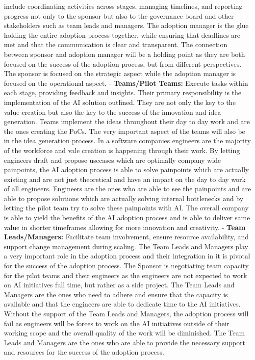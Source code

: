 \documentclass[]{imc-inf}
\begin{document}
include coordinating activities across stages, managing timelines, and
reporting progress not only to the sponsor but also to the governance
board and other stakeholders such as team leads and managers. The
adoption manager is the glue holding the entire adoption process
together, while ensuring that deadlines are met and that the
communication is clear and transparent. The connection between sponsor
and adoption manager will be a holding point as they are both focused on
the success of the adoption process, but from different perspectives.
The sponsor is focused on the strategic aspect while the adoption
manager is focused on the operational aspect. - \textbf{Teams/Pilot
	Teams:} Execute tasks within each stage, providing feedback and
insights. Their primary responsibility is the implementation of the AI
solution outlined. They are not only the key to the value creation but
also the key to the success of the innovation and idea generation. Teams
implement the ideas throughout their day to day work and are the ones
creating the PoCs. The very important aspect of the teams will also be
in the idea generation process. In a software companies engineers are
the majority of the workforce and vale creation is happening through
their work. By letting engineers draft and propose usecases which are
optimally company wide painpoints, the AI adoption process is able to
solve painpoints which are actually existing and are not just
theoretical and have an impact on the day to day work of all engineers.
Engineers are the ones who are able to see the painpoints and are able
to propose solutions which are actually solving internal bottlenecks and
by letting the pilot team try to solve these painpoints with AI. The
overall company is able to yield the benefits of the AI adoption process
and is able to deliver same value in shorter timeframes allowing for
more innovation and creativity. - \textbf{Team Leads/Managers:}
Facilitate team involvement, ensure resource availability, and support
change management during scaling. The Team Leads and Managers play a
very important role in the adoption process and their integration in it
is pivotal for the success of the adoption process. The Sponsor is
negotiating team capacity for the pilot teams and their engineers as the
engineers are not expected to work on AI initiatives full time, but
rather as a side project. The Team Leads and Managers are the ones who
need to adhere and ensure that the capacity is available and that the
engineers are able to dedicate time to the AI initiatives. Without the
support of the Team Leads and Managers, the adoption process will fail
as engineers will be forces to work on the AI initiatives outside of
their working scope and the overall quality of the work will be
diminished. The Team Leads and Managers are the ones who are able to
provide the necessary support and resources for the success of the
adoption process.
\end{document}

